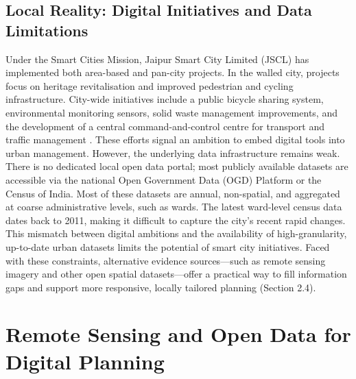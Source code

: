 \documentclass[
  12pt,
  oneside]{book}
\begin{document}
\subsection{Local Reality: Digital Initiatives and Data Limitations}\label{local-reality-digital-initiatives-and-data-limitations}

Under the Smart Cities Mission, Jaipur Smart City Limited (JSCL) has implemented both area-based and pan-city projects. In the walled city, projects focus on heritage revitalisation and improved pedestrian and cycling infrastructure. City-wide initiatives include a public bicycle sharing system, environmental monitoring sensors, solid waste management improvements, and the development of a central command-and-control centre for transport and traffic management \autocite{jaipursmartcitylimitedJaipurSmartCity2025}. These efforts signal an ambition to embed digital tools into urban management. However, the underlying data infrastructure remains weak. There is no dedicated local open data portal; most publicly available datasets are accessible via the national Open Government Data (OGD) Platform or the Census of India. Most of these datasets are annual, non-spatial, and aggregated at coarse administrative levels, such as wards. The latest ward-level census data dates back to 2011, making it difficult to capture the city's recent rapid changes. This mismatch between digital ambitions and the availability of high-granularity, up-to-date urban datasets limits the potential of smart city initiatives. Faced with these constraints, alternative evidence sources---such as remote sensing imagery and other open spatial datasets---offer a practical way to fill information gaps and support more responsive, locally tailored planning (Section 2.4).

\section{Remote Sensing and Open Data for Digital Planning}\label{remote-sensing-and-open-data-for-digital-planning}
\end{document}
